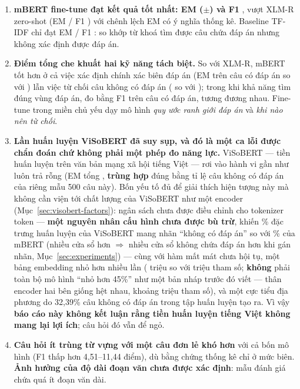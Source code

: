 \begin{enumerate}
  \item \textbf{mBERT fine-tune đạt kết quả tốt nhất: EM \histMbertEM{} ($\pm$\histMbertEMwald{})
        và F1 \histMbertFone{}}, vượt XLM-R zero-shot (EM \histXlmrEM{} / F1 \histXlmrFone{}) với
        chênh lệch EM có ý nghĩa thống kê. Baseline TF-IDF chỉ đạt EM \histBaselineEM{} / F1
        \histBaselineFone{}: so khớp từ khoá tìm được câu chứa đáp án nhưng không xác định được
        đáp án.
  \item \textbf{Điểm tổng che khuất hai kỹ năng tách biệt.} So với XLM-R, mBERT tốt hơn ở cả việc
        xác định chính xác biên đáp án (EM trên câu có đáp án \histMbertHasAnsEM{} so với
        \histXlmrHasAnsEM{}) lẫn việc từ chối câu không có đáp án (\histMbertNoAnsEM{} so với
        \histXlmrNoAnsEM{}); trong khi khả năng tìm đúng vùng đáp án, đo bằng F1 trên câu có đáp
        án, tương đương nhau. Fine-tune trong miền chủ yếu dạy mô hình \emph{quy ước ranh giới
        đáp án} và \emph{khi nào nên từ chối}.
  \item \textbf{Lần huấn luyện ViSoBERT đã suy sụp, và đó là một ca lỗi được chẩn đoán chứ không
        phải một phép đo năng lực.} ViSoBERT --- tiền huấn luyện trên văn bản mạng xã hội tiếng
        Việt --- rơi vào hành vi gần như luôn trả rỗng (EM tổng \histVisoEM{}, \textbf{trùng hợp}
        đúng bằng tỉ lệ câu không có đáp án của riêng mẫu 500 câu này). Bốn yếu tố đủ để giải
        thích hiện tượng này mà không cần viện tới chất lượng của ViSoBERT như một encoder
        (Mục~\ref{sec:visobert-factors}): ngân sách  chưa được điều chỉnh cho
        tokenizer \tokVocabViso{} token --- \textbf{một nguyên nhân cấu hình chưa được bù trừ},
        khiến \nullRateViso{}\% đặc trưng huấn luyện của ViSoBERT mang nhãn ``không có đáp án''
        so với \nullRateMbert{}\% của mBERT (nhiều cửa sổ hơn $\Rightarrow$ nhiều cửa sổ không
        chứa đáp án hơn khi gán nhãn, Mục~\ref{sec:experiments}) --- cùng với hàm mất mát chưa
        hội tụ, một bảng embedding nhỏ hơn nhiều lần (\tokEmbParamsViso{} triệu so với
        \tokEmbParamsMbert{} triệu tham số; \textbf{không} phải toàn bộ mô hình ``nhỏ hơn 45\%''
        như một bản nháp trước đó viết --- thân encoder hai bên giống hệt nhau, khoảng
        \tokBodyParamsMbert{} triệu tham số), và một cực tiểu địa phương do 32,39\% câu không có
        đáp án trong tập huấn luyện tạo ra. Vì vậy \textbf{báo cáo này không kết luận rằng tiền
        huấn luyện tiếng Việt không mang lại lợi ích}; câu hỏi đó vẫn để ngỏ.
  \item \textbf{Câu hỏi ít trùng từ vựng với một câu đơn lẻ khó hơn} với cả bốn mô hình (F1 thấp
        hơn 4,51--11,44 điểm), dù bằng chứng thống kê chỉ ở mức biên. \textbf{Ảnh hưởng của độ dài
        đoạn văn chưa được xác định}: mẫu đánh giá chứa quá ít đoạn văn dài.
\end{enumerate}
\fi


